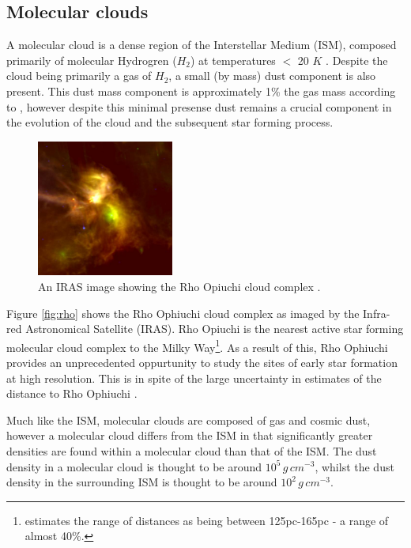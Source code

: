 \documentclass{report}
\begin{document}
\subsection{Molecular clouds}
A molecular cloud is a dense region of the Interstellar Medium (ISM), composed primarily of molecular Hydrogren ($H_{2}$) at temperatures $<$ 20 $K$ \parencite{dustopacity}. Despite the cloud being primarily a gas of $H_{2}$, a small (by mass) dust component is also present. This dust mass component is approximately 1\% the gas mass according to \textcite{noise}, however despite this minimal presense dust remains a crucial component in the evolution of the cloud and the subsequent star forming process.

\begin{figure}
  \begin{center}
    \includegraphics[width=0.4\textwidth]{../img/rho.jpg}
    \caption[An IRAS image showing the Rho Opiuchi cloud complex \parencite{rho}.]{An IRAS image showing the Rho Opiuchi cloud complex \parencite{rho}.}
  \end{center}
\end{figure} \label{fig:rho}

Figure \ref{fig:rho} shows the Rho Ophiuchi cloud complex as imaged by the Infra-red Astronomical Satellite (IRAS). Rho Opiuchi is the nearest active star forming molecular cloud complex to the Milky Way\footnote{\textcite{rho-dist} estimates the range of distances as being between 125pc-165pc - a range of almost 40\%.}. As a result of this, Rho Ophiuchi provides an unprecedented oppurtunity to study the sites of early star formation at high resolution. This is in spite of the large uncertainty in estimates of the distance to Rho Ophiuchi \parencite{rho-dist}.

Much like the ISM, molecular clouds are composed of gas and cosmic dust, however a molecular cloud differs from the ISM in that significantly greater densities are found within a molecular cloud than that of the ISM. The dust density in a molecular cloud is thought to be around $10^{5}\,g\,cm^{-3}$, whilst the dust density in the surrounding ISM is thought to be around $10^{2}\,g\,cm^{-3}$.
\end{document}

